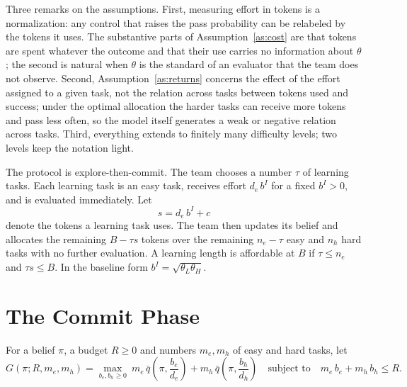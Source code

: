 \documentclass[11pt]{article}
\theoremstyle{definition}
\begin{document}
Three remarks on the assumptions. First, measuring effort in tokens is a normalization: any control that raises the pass probability can be relabeled by the tokens it uses. The substantive parts of Assumption~\ref{as:cost} are that tokens are spent whatever the outcome and that their use carries no information about $\theta$; the second is natural when $\theta$ is the standard of an evaluator that the team does not observe. Second, Assumption~\ref{as:returns} concerns the effect of the effort assigned to a given task, not the relation across tasks between tokens used and success; under the optimal allocation the harder tasks can receive more tokens and pass less often, so the model itself generates a weak or negative relation across tasks. Third, everything extends to finitely many difficulty levels; two levels keep the notation light.

The protocol is explore-then-commit. The team chooses a number $\tau$ of learning tasks. Each learning task is an easy task, receives effort $d_e\,b^I$ for a fixed $b^I>0$, and is evaluated immediately. Let
\[
s=d_e\,b^I+c
\]
denote the tokens a learning task uses. The team then updates its belief and allocates the remaining $B-\tau s$ tokens over the remaining $n_e-\tau$ easy and $n_h$ hard tasks with no further evaluation. A learning length is affordable at $B$ if $\tau\le n_e$ and $\tau s\le B$. In the baseline form $b^I=\sqrt{\theta_L\theta_H}$.

\section{The Commit Phase}

For a belief $\pi$, a budget $R\ge0$ and numbers $m_e,m_h$ of easy and hard tasks, let
\begin{equation}\label{eq:G}
G(\pi;R,m_e,m_h)=\max_{b_e,b_h\ge0}\ m_e\,\bar q\!\left(\pi,\frac{b_e}{d_e}\right)+m_h\,\bar q\!\left(\pi,\frac{b_h}{d_h}\right)
\quad\text{subject to}\quad m_e\,b_e+m_h\,b_h\le R .
\end{equation}
\end{document}
